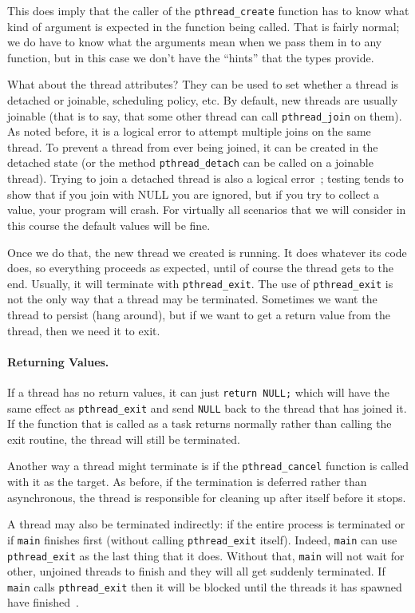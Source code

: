 \documentclass[a4paper]{report}
\begin{document}
\begin{appendices}
This does imply that the caller of the \texttt{pthread\_create} function has to know what kind of argument is expected in the function being called. That is fairly normal; we do have to know what the arguments mean when we pass them in to any function, but in this case we don't have the ``hints'' that the types provide.

What about the thread attributes? They can be used to set whether a thread is detached or joinable, scheduling policy, etc. By default, new threads are usually joinable (that is to say, that some other thread can call \texttt{pthread\_join} on them). As noted before, it is a logical error to attempt multiple joins on the same thread. To prevent a thread from ever being joined, it can be created in the detached state (or the method \texttt{pthread\_detach} can be called on a joinable thread). Trying to join a detached thread is also a logical error~\cite{pthreads}; testing tends to show that if you join with NULL you are ignored, but if you try to collect a value, your program will crash. For virtually all scenarios that we will consider in this course the default values will be fine. 

Once we do that, the new thread we created is running. It does whatever its code does, so everything proceeds as expected, until of course the thread gets to the end. Usually, it will terminate with \texttt{pthread\_exit}. The use of \texttt{pthread\_exit} is not the only way that a thread may be terminated. Sometimes we want the thread to persist (hang around), but if we want to get a return value from the thread, then we need it to exit. 

\paragraph{Returning Values.} If a thread has no return values, it can just \texttt{return NULL;} which will have the same effect as \texttt{pthread\_exit} and send \texttt{NULL} back to the thread that has joined it. If the function that is called as a task returns normally rather than calling the exit routine, the thread will still be terminated. 

Another way a thread might terminate is if the \texttt{pthread\_cancel} function is called with it as the target. As before, if the termination is deferred rather than asynchronous, the thread is responsible for cleaning up after itself before it stops.

A thread may also be terminated indirectly: if the entire process is terminated or if \texttt{main} finishes first (without calling \texttt{pthread\_exit} itself). Indeed, \texttt{main} can use \texttt{pthread\_exit} as the last thing that it does. Without that, \texttt{main} will not wait for other, unjoined threads to finish and they will all get suddenly terminated. If \texttt{main} calls \texttt{pthread\_exit} then it will be blocked until the threads it has spawned have finished~\cite{pthreads}.


\end{appendices}
\end{document}
